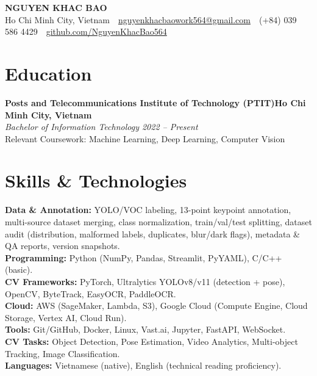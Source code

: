 \documentclass[10pt, a4paper]{article}
\newcommand{\entryhead}[2]{%
    \noindent\textbf{#1}\hfill\textbf{#2}\\[-2pt]
}
\newcommand{\entrysub}[1]{%
    \noindent\textit{#1}\\[1pt]
}
\begin{document}
\begin{center}
    {\LARGE\textbf{NGUYEN KHAC BAO}}\\[5pt]
    Ho Chi Minh City, Vietnam
    \,\textbullet\,
    \href{mailto:nguyenkhacbaowork564@gmail.com}{nguyenkhacbaowork564@gmail.com}
    \,\textbullet\,
    (+84) 039 586 4429
    \,\textbullet\,
    \href{https://github.com/NguyenKhacBao564}{github.com/NguyenKhacBao564}
\end{center}

\vspace{4pt}

\section{Education}

\entryhead{Posts and Telecommunications Institute of Technology (PTIT)}{Ho Chi Minh City, Vietnam}
\entrysub{Bachelor of Information Technology \hfill 2022 -- Present}
Relevant Coursework: Machine Learning, Deep Learning, Computer Vision

\section{Skills \& Technologies}

\noindent
\textbf{Data \& Annotation:} YOLO/VOC labeling, 13-point keypoint annotation, multi-source dataset merging, class normalization, train/val/test splitting, dataset audit (distribution, malformed labels, duplicates, blur/dark flags), metadata \& QA reports, version snapshots.\\
\textbf{Programming:} Python (NumPy, Pandas, Streamlit, PyYAML), C/C++ (basic).\\
\textbf{CV Frameworks:} PyTorch, Ultralytics YOLOv8/v11 (detection + pose), OpenCV, ByteTrack, EasyOCR, PaddleOCR.\\
\textbf{Cloud:} AWS (SageMaker, Lambda, S3), Google Cloud (Compute Engine, Cloud Storage, Vertex AI, Cloud Run).\\
\textbf{Tools:} Git/GitHub, Docker, Linux, Vast.ai, Jupyter, FastAPI, WebSocket.\\
\textbf{CV Tasks:} Object Detection, Pose Estimation, Video Analytics, Multi-object Tracking, Image Classification.\\
\textbf{Languages:} Vietnamese (native), English (technical reading proficiency).

\end{document}
